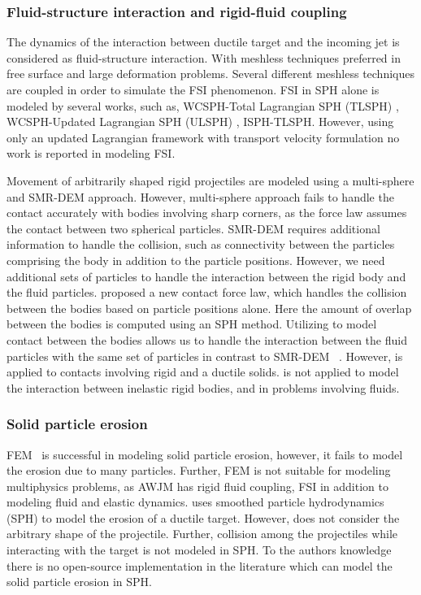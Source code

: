 \subsubsection*{Fluid-structure interaction and rigid-fluid coupling}
The dynamics of the interaction between ductile target and the incoming jet is
considered as fluid-structure interaction. With meshless techniques preferred in
free surface and large deformation problems. Several different meshless
techniques are coupled in order to simulate the FSI phenomenon. FSI in SPH alone
is modeled by several works, such as, WCSPH-Total Lagrangian SPH (TLSPH)
\citep{zhan2019stabilized}, WCSPH-Updated Lagrangian SPH (ULSPH)
\citep{antoci2007numerical}, ISPH-TLSPH\citep{salehizadeh2022coupled}. However,
using only an updated Lagrangian framework with transport velocity formulation
no work is reported in modeling FSI.

Movement of arbitrarily shaped rigid projectiles are modeled using a
multi-sphere and SMR-DEM approach. However, multi-sphere approach fails to
handle the contact accurately with bodies involving sharp corners, as the force
law assumes the contact between two spherical particles. SMR-DEM requires
additional information to handle the collision, such as connectivity between the
particles comprising the body in addition to the particle positions. However, we
need additional sets of particles to handle the interaction between the rigid
body and the fluid particles. \cite{mohseni2021particle} proposed a new contact
force law, which handles the collision between the bodies based on particle
positions alone. Here the amount of overlap between the bodies is computed using
an SPH method. Utilizing \citep{mohseni2021particle} to model contact between
the bodies allows us to handle the interaction between the fluid particles with
the same set of particles in contrast to SMR-DEM ~\cite{zhan2021surface}.
However, \citep{mohseni2021particle} is applied to contacts involving rigid and
a ductile solids. \citep{mohseni2021particle} is not applied to model the
interaction between inelastic rigid bodies, and in problems involving fluids.


\subsubsection*{Solid particle erosion}
FEM~\citep{takaffoli2009finite} is successful in modeling solid particle
erosion, however, it fails to model the erosion due to many particles. Further,
FEM is not suitable for modeling multiphysics problems, as AWJM has rigid fluid
coupling, FSI in addition to modeling fluid and elastic dynamics.
\cite{dong2016smoothed} uses smoothed particle hydrodynamics (SPH) to model the
erosion of a ductile target. However, \cite{dong2016smoothed} does not consider
the arbitrary shape of the projectile. Further, collision among the projectiles
while interacting with the target is not modeled in SPH. To the authors
knowledge there is no open-source implementation in the literature which can
model the solid particle erosion in SPH.

